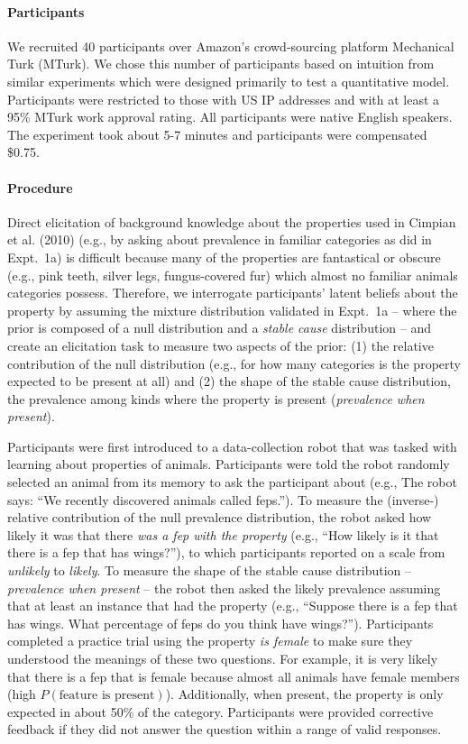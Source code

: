 \documentclass[floatsintext,man]{apa6}
\let\oldparagraph\paragraph
\renewcommand{\paragraph}[1]{\oldparagraph{#1}\mbox{}}
\begin{document}
\paragraph{Participants}
We recruited 40 participants over Amazon's crowd-sourcing platform
Mechanical Turk (MTurk). We chose this number of participants based on
intuition from similar experiments which were designed primarily to test
a quantitative model. Participants were restricted to those with US IP
addresses and with at least a 95\% MTurk work approval rating. All
participants were native English speakers. The experiment took about 5-7
minutes and participants were compensated \$0.75.

\paragraph{Procedure}
Direct elicitation of background knowledge about the properties used in Cimpian et al. (2010) (e.g., by asking about prevalence in familiar
categories as did in Expt.~1a) is difficult because many of the properties are fantastical or obscure (e.g., pink teeth, silver legs, fungus-covered fur) which almost no familiar animals categories possess. 
Therefore,  we interrogate participants' latent beliefs about the property by assuming the mixture distribution validated in Expt.~1a -- where the prior is composed of a null distribution and a  \emph{stable cause} distribution -- and create an elicitation task to measure two aspects of the prior: (1) the relative contribution of the null distribution (e.g., for how many categories is the
property expected to be present at all) and (2) the shape of the stable cause distribution, the prevalence among
kinds where the property is present (\emph{prevalence when present}).

Participants were first introduced to a data-collection robot that was tasked with learning about properties of animals. Participants
were told the robot randomly selected an animal from its memory to ask
the participant about (e.g., The robot says: \enquote{We recently
discovered animals called feps.}). To measure the (inverse-) relative contribution
of the null prevalence distribution, the robot asked how likely it was
that there \emph{was a fep with the property} (e.g., \enquote{How likely is
it that there is a fep that has wings?}), to which participants reported
on a scale from \emph{unlikely} to \emph{likely}. To measure the shape of the stable cause distribution -- \emph{prevalence when present} -- the robot then asked the likely
prevalence assuming that at least an instance that had the property (e.g.,
\enquote{Suppose there is a fep that has wings. What percentage of feps
do you think have wings?}). Participants completed a practice trial
using the property \emph{is female} to make sure they understood the
meanings of these two questions. For example, it is very likely that
there is a fep that is female because almost all animals have female
members (high \(P(\text{feature is present})\)). Additionally, when
present, the property is only expected in about 50\% of the category.
Participants were provided corrective feedback if they did not answer the question within a range of valid responses.
\end{document}
